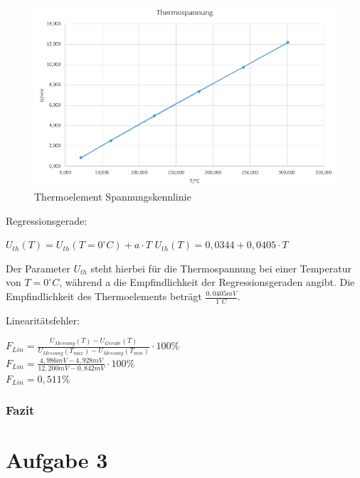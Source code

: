 \documentclass[a4paper,11pt,oneside]{article}
\begin{document}
\begin{figure}[h]
\centering
\includegraphics[scale=0.8]{Bilder/Aufg2Diagramm.png}
\caption{Thermoelement Spannungskennlinie}
\end{figure}

Regressionsgerade:
\begin{center}
$U_{th}(T) = U_{th}(T=0^\circ C) + a \cdot T$
$U_{th}(T) = 0,0344 + 0,0405 \cdot T$
\end{center}

Der Parameter $U_{th}$ steht hierbei für die Thermospannung bei einer Temperatur von $T = 0^\circ C$, während a die Empfindlichkeit der Regressionsgeraden angibt. Die Empfindlichkeit des Thermoelements beträgt $\frac{0,0405 mV}{1 ^\circ C}$.

\newpage

Linearitätsfehler:

\begin{center}
$F_{Lin} = \frac{U_{Messung}(T) - U_{Gerade}(T)}{U_{Messung}(T_{max}) - U_{Messung}(T_{min})}\cdot 100\%$\\
\vspace{0.5cm}
$F_{Lin} = \frac{4,986mV - 4,928mV}{12,200mV-0,842mV}\cdot 100\%$\\
\vspace{0.5cm}
$F_{Lin} = 0,511\%$
\end{center}

\subsubsection{Fazit}


\section{Aufgabe 3}
\end{document}
